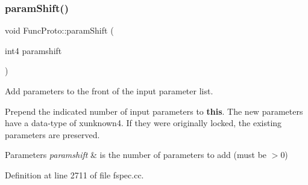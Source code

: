 \subsubsection{\texorpdfstring{paramShift()}{paramShift()}}
{\footnotesize\ttfamily void Func\+Proto\+::param\+Shift (\begin{DoxyParamCaption}\item[{int4}]{paramshift }\end{DoxyParamCaption})\hspace{0.3cm}{\ttfamily [protected]}}



Add parameters to the front of the input parameter list. 

Prepend the indicated number of input parameters to {\bfseries{this}}. The new parameters have a data-\/type of xunknown4. If they were originally locked, the existing parameters are preserved. 
\begin{DoxyParams}{Parameters}
{\em paramshift} & is the number of parameters to add (must be $>$0) \\
\hline
\end{DoxyParams}


Definition at line 2711 of file fspec.\+cc.

